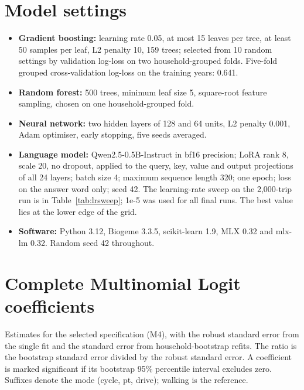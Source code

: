 \documentclass[11pt,a4paper]{article}
\newcommand{\tabpath}{tables/}
\begin{document}
\section{Model settings}
\label{app:settings}
\begin{itemize}
\item \textbf{Gradient boosting:} learning rate 0.05, at most 15 leaves per tree, at least 50 samples per leaf, L2 penalty 10, 159 trees; selected from 10 random settings by validation log-loss on two household-grouped folds. Five-fold grouped cross-validation log-loss on the training years: 0.641.
\item \textbf{Random forest:} 500 trees, minimum leaf size 5, square-root feature sampling, chosen on one household-grouped fold.
\item \textbf{Neural network:} two hidden layers of 128 and 64 units, L2 penalty 0.001, Adam optimiser, early stopping, five seeds averaged.
\item \textbf{Language model:} Qwen2.5-0.5B-Instruct in bf16 precision; LoRA rank 8, scale 20, no dropout, applied to the query, key, value and output projections of all 24 layers; batch size 4; maximum sequence length 320; one epoch; loss on the answer word only; seed 42. The learning-rate sweep on the 2,000-trip run is in Table~\ref{tab:lrsweep}; 1e-5 was used for all final runs. The best value lies at the lower edge of the grid.
\item \textbf{Software:} Python 3.12, Biogeme 3.3.5, scikit-learn 1.9, MLX 0.32 and mlx-lm 0.32. Random seed 42 throughout.
\end{itemize}

\begin{table}[H]
\centering\small

\caption{Learning-rate sweep for fine-tuning on 2,000 trips, evaluated on the 1,000 validation trips (no test data).}
\label{tab:lrsweep}
\end{table}

\section{Complete Multinomial Logit coefficients}
\label{app:coef}
Estimates for the selected specification (M4), with the robust standard error from the single fit and the standard error from \bootN{} household-bootstrap refits. The ratio is the bootstrap standard error divided by the robust standard error. A coefficient is marked significant if its bootstrap 95\% percentile interval excludes zero. Suffixes denote the mode (cycle, pt, drive); walking is the reference.
{\small
\IfFileExists{\tabpath coefs.tex}{}{}
}
\end{document}
